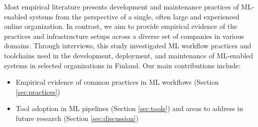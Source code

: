 Most empirical literature presents development and maintenance practices of ML-enabled systems from the perspective of a single, often large and experienced online organization. In contrast, we aim to provide empirical evidence of the practices and infrastructure setups across a diverse set of companies in various domains. Through interviews, this study investigated ML workflow practices and toolchains \DIFaddbegin {}\DIFaddend used in the development, deployment, and maintenance of ML-enabled systems in selected \DIFdelbegin {}\DIFdelend organizations in Finland. Our main contributions include:
\begin{itemize}
    \item Empirical evidence of common practices in ML workflows (Section \ref{sec:practices})
    \item Tool adoption in ML pipelines (Section \ref{sec:tools}) and areas to address in future research (Section \ref{sec:discussion})

\end{itemize}


